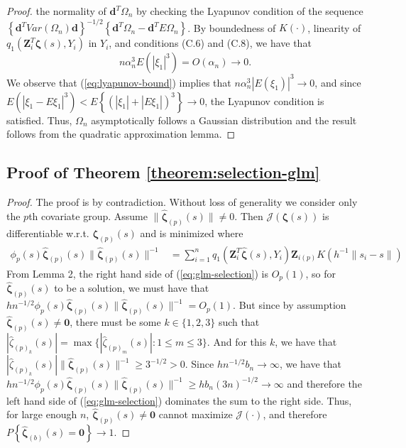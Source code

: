 \documentclass[authoryear,review, 12pt]{elsarticle}
\begin{document}
\begin{proof}
the normality of $\bm{d}^{T}\Omega_{n}$ by checking the Lyapunov
condition of the sequence $\left\{ \bm{d}^{T}Var\left(\Omega_{n}\right)\bm{d}\right\} ^{-1/2}\left\{ \bm{d}^{T}\Omega_{n}-\bm{d}^{T}E\Omega_{n}\right\} $.
By boundedness of $K\left(\cdot\right)$, linearity of $q_{1}\left(\bm{Z}_{i}^{T}\bm{\zeta}(s),Y_{i}\right)$
in $Y_{i}$, and conditions (C.6) and (C.8), we have that
\begin{equation}
n\alpha_{n}^{3}E\left(\left|\xi_{1}\right|^{3}\right)=O\left(\alpha_{n}\right)\to0.\label{eq:lyapunov-bound}
\end{equation}
We observe that (\ref{eq:lyapunov-bound}) implies that $n\alpha_{n}^{3}\left|E\left(\xi_{1}\right)\right|^{3}\to0$,
and since $E\left(\left|\xi_{1}-E\xi_{1}\right|^{3}\right)<E\left\{ \left(\left|\xi_{1}\right|+\left|E\xi_{1}\right|\right)^{3}\right\} \to0$,
the Lyapunov condition is satisfied. Thus, $\Omega_{n}$ asymptotically
follows a Gaussian distribution and the result follows from the quadratic
approximation lemma.
\end{proof}
\subsection*{Proof of Theorem \ref{theorem:selection-glm}}
\begin{proof}
The proof is by contradiction. Without loss of generality we consider
only the $p$th covariate group.
Assume $\|\hat{\bm{\zeta}}_{(p)}(s)\|\ne0$. Then $\mathcal{J}\left(\bm{\zeta}(s)\right)$
is differentiable w.r.t. $\bm{\zeta}_{(p)}(s)$ and is minimized
where 
\begin{align}
\phi_{p}(s)\hat{\bm{\zeta}}_{(p)}(s)\|\hat{\bm{\zeta}}_{(p)}(s)\|^{-1} &= \sum_{i=1}^{n}q_{1}\!\left(\bm{Z}_{i}^{T}\hat{\bm{\zeta}}(s),Y_{i}\right)\bm{Z}_{i(p)}K\left(h^{-1}\|s_{i}-s\|\right)\label{eq:glm-selection}
\end{align}
From Lemma 2, the right hand side of (\ref{eq:glm-selection})
is $O_{p}\left(1\right)$, so for $\hat{\bm{\zeta}}_{(p)}(s)$
to be a solution, we must have that $hn^{-1/2}\phi_{p}(s)\hat{\bm{\zeta}}_{(p)}(s)\|\hat{\bm{\zeta}}_{(p)}(s)\|^{-1}=O_{p}\left(1\right)$.
But since by assumption $\hat{\bm{\zeta}}_{(p)}(s)\ne\bm{0}$,
there must be some $k\in\{1,2,3\}$ such that $|\hat{\zeta}_{(p)_{k}}(s)|=\max\{|\hat{\zeta}_{(p)_{m}}(s)|:1\le m\le3\}$.
And for this $k$, we have that $|\hat{\zeta}_{(p)_{k}}(s)|\|\hat{\bm{\zeta}}_{(p)}(s)\|^{-1}\ge3^{-1/2}>0$.
Since $hn^{-1/2}b_{n}\to\infty$, we have that $hn^{-1/2}\phi_{p}(s)\hat{\bm{\zeta}}_{(p)}(s)\|\hat{\bm{\zeta}}_{(p)}(s)\|^{-1}\ge hb_{n}(3n)^{-1/2}\to\infty$
and therefore the left hand side of (\ref{eq:glm-selection}) dominates
the sum to the right side. Thus, for large enough $n$, $\hat{\bm{\zeta}}_{(p)}(s)\ne\bm{0}$
cannot maximize $\mathcal{J}\left(\cdot\right)$, and therefore $P\left\{ \hat{\bm{\zeta}}_{(b)}(s)=\bm{0}\right\} \to1$. 
\end{proof}
\end{document}
